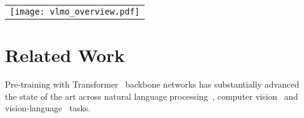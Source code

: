 \documentclass{article}
\newcommand\our{\textsc{VLMo}}
\newcommand\mome{\textsc{MoME}}
\begin{document}
\begin{figure*}[t]
\begin{center}
\begin{tabular}{c}
\texttt{[image: vlmo\_overview.pdf]}
\end{tabular}
\end{center}
\caption{Overview of \our{} pre-training. 
We introduce mixture-of-modality-experts (\mome{}) Transformer to encode different modality input by modality-specific experts.
The model parameters are shared across image-text contrastive learning, masked language modeling, and image-text matching pre-training tasks.
During fine-tuning, the flexible modeling enables us to use \our{} as either a dual encoder (i.e., separately encode images and text for retrieval tasks) or a fusion encoder (i.e., jointly encode image-text pairs for better interaction across modalities).
}
\label{fig:overview}
\end{figure*}


\section{Related Work}
\label{sec:related:work}

Pre-training with Transformer~\citep{transformer} backbone networks has substantially advanced the state of the art across natural language processing~\citep{gpt,bert,roberta,bart,unilm,t5,unilm2,xlm,xlmr,xnlg,infoxlm,xlme,deltalm}, computer vision~\citep{vit,deit,beit} and vision-language~\citep{lxmert,vl-bert,uniter,vinvl,clip,align,vilt,albef} tasks.
\end{document}
